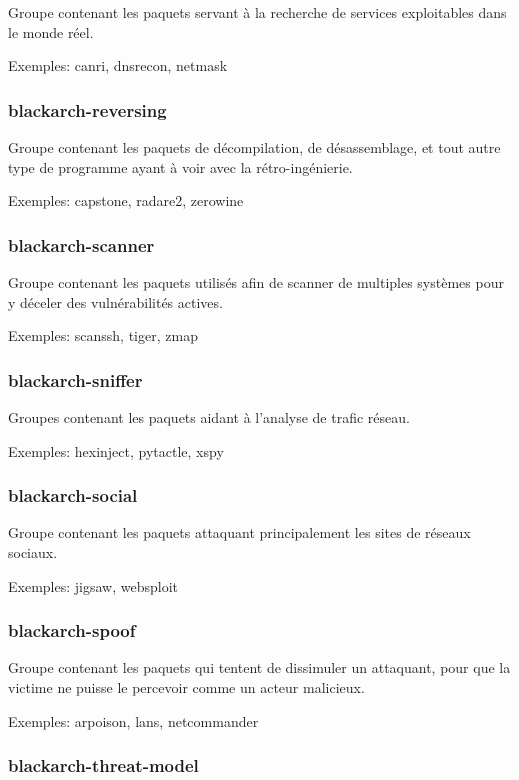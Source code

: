 \documentclass[a4paper, oneside, 11pt]{book}
\begin{document}
Groupe contenant les paquets servant à la recherche de services exploitables dans
le monde réel.

Exemples: canri, dnsrecon, netmask

\subsubsection{blackarch-reversing}

Groupe contenant les paquets de décompilation, de désassemblage, et tout autre
type de programme ayant à voir avec la rétro-ingénierie.

Exemples: capstone, radare2, zerowine

\subsubsection{blackarch-scanner}

Groupe contenant les paquets utilisés afin de scanner de multiples systèmes pour 
y déceler des vulnérabilités actives.

Exemples: scanssh, tiger, zmap

\subsubsection{blackarch-sniffer}

Groupes contenant les paquets aidant à l'analyse de trafic réseau.

Exemples: hexinject, pytactle, xspy

\subsubsection{blackarch-social}

Groupe contenant les paquets attaquant principalement les sites de réseaux
sociaux.

Exemples: jigsaw, websploit

\subsubsection{blackarch-spoof}

Groupe contenant les paquets qui tentent de dissimuler un attaquant, pour que 
la victime ne puisse le percevoir comme un acteur malicieux.

Exemples: arpoison, lans, netcommander

\subsubsection{blackarch-threat-model}
\end{document}
